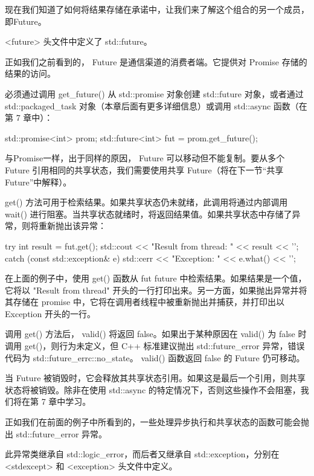 现在我们知道了如何将结果存储在承诺中，让我们来了解这个组合的另一个成员，即Future。


<future> 头文件中定义了 std::future。

正如我们之前看到的， Future 是通信渠道的消费者端。它提供对 Promise 存储的结果的访问。

必须通过调用 get\_future() 从 std::promise 对象创建 std::future 对象，或者通过 std::packaged\_task 对象（本章后面有更多详细信息）或调用 std::async 函数（在第 7 章中）：

\begin{cpp}
std::promise<int> prom;
std::future<int> fut = prom.get_future();
\end{cpp}

与Promise一样，出于同样的原因， Future 可以移动但不能复制。要从多个 Future 引用相同的共享状态，我们需要使用共享 Future（将在下一节“共享 Future”中解释）。

get() 方法可用于检索结果。如果共享状态仍未就绪，此调用将通过内部调用 wait() 进行阻塞。当共享状态就绪时，将返回结果值。如果共享状态中存储了异常，则将重新抛出该异常：

\begin{cpp}
try {
    int result = fut.get();
    std::cout << "Result from thread: " << result << '\n';
} catch (const std::exception& e) {
    std::cerr << "Exception: " << e.what() << '\n';
}
\end{cpp}

在上面的例子中，使用 get() 函数从 fut future 中检索结果。如果结果是一个值，它将以 "Result from thread" 开头的一行打印出来。另一方面，如果抛出异常并将其存储在 promise 中，它将在调用者线程中被重新抛出并捕获，并打印出以 Exception 开头的一行。

调用 get() 方法后， valid() 将返回 false。如果出于某种原因在 valid() 为 false 时调用 get()，则行为未定义，但 C++ 标准建议抛出 std::future\_error 异常，错误代码为 std::future\_errc::no\_state。 valid() 函数返回 false 的 Future 仍可移动。

当 Future 被销毁时，它会释放其共享状态引用。如果这是最后一个引用，则共享状态将被销毁。除非在使用 std::async 的特定情况下，否则这些操作不会阻塞，我们将在第 7 章中学习。


正如我们在前面的例子中所看到的，一些处理异步执行和共享状态的函数可能会抛出 std::future\_error 异常。

此异常类继承自 std::logic\_error，而后者又继承自 std::exception，分别在 <stdexcept> 和 <exception> 头文件中定义。


